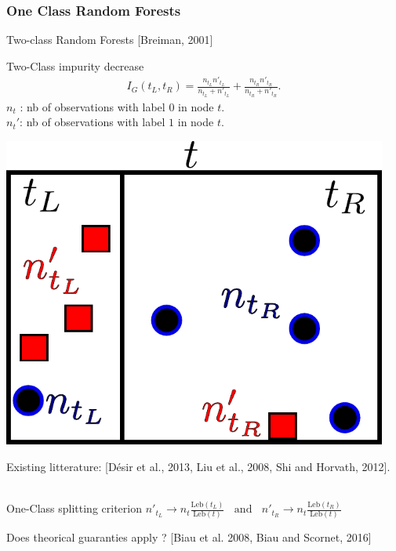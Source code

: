 \documentclass[9pt]{beamer}
\newcommand\blue{\color{blue} }
\def\leb{\text{Leb}}
\begin{document}
\begin{frame}
\frametitle{One Class Random Forests}


\begin{block}{Two-class Random Forests [Breiman, 2001]}
\begin{minipage}{0.65\textwidth}
{\blue Two-Class impurity decrease} 
\begin{align*}
I_G(t_L, t_R)= \frac{n_{t_L} n'_{t_L}}{n_{t_L} +  n'_{t_L}} + \frac{n_{t_R} n'_{t_R}}{n_{t_R} +  n'_{t_R}}.
\end{align*}
$n_t$ : nb of observations with label $0$ in node $t$.\\
$n_t'$: nb of observations with label $1$ in node $t$.

\end{minipage}
\begin{minipage}{0.3\textwidth}
	\centering
	\includegraphics[width=0.95\textwidth]{sourcefigs/tree.pdf}
\end{minipage}
\end{block}

Existing litterature:
{\small [Désir et al., 2013, Liu et al., 2008, Shi and Horvath, 2012].}\\~\\

\begin{alertblock}{One-Class splitting criterion }%
$n'_{t_L} \to n_{t} \frac{\leb(t_L)}{\leb(t)} ~~~~\text{and}~~~~
n'_{t_R} \to n_{t} \frac{\leb(t_R)}{\leb(t)}
$%


\end{alertblock}
%
Does theorical guaranties apply ?
{\small [Biau et al. 2008, Biau and Scornet, 2016]}

\end{frame}
\end{document}
